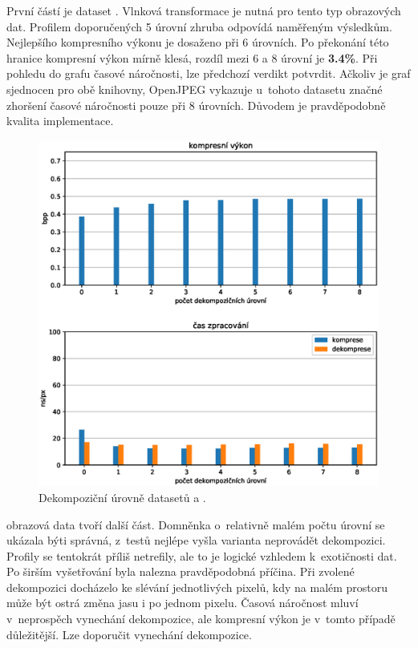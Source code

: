 \noindent První částí je dataset . Vlnková transformace je nutná pro tento typ obrazových dat. Profilem doporučených 5 úrovní zhruba odpovídá naměřeným výsledkům. Nejlepšího kompresního výkonu je dosaženo při 6 úrovních. Po překonání této hranice kompresní výkon mírně klesá, rozdíl mezi 6 a 8 úrovní je \textbf{3.4\%}. Při pohledu do grafu časové náročnosti, lze předchozí verdikt potvrdit. Ačkoliv je graf sjednocen pro obě knihovny, OpenJPEG vykazuje u~tohoto datasetu značné zhoršení časové náročnosti pouze při 8 úrovních. Důvodem je pravděpodobně kvalita implementace.

\begin{figure}[hbt!]
  \centering
  \hspace*{-0.75cm}
  \includegraphics[width=16cm]{obrazky-figures/levels/bitonal_levels.eps}
  \caption{Dekompoziční úrovně datasetů  a .}
\end{figure}

\noindent {} obrazová data tvoří další část. Domněnka o~relativně malém počtu úrovní se ukázala býti správná, z~testů nejlépe vyšla varianta neprovádět dekompozici. Profily se tentokrát příliš netrefily, ale to je logické vzhledem k~exotičnosti dat. Po širším vyšetřování byla nalezna pravděpodobná příčina. Při zvolené dekompozici docházelo ke slévání jednotlivých pixelů, kdy na malém prostoru může být ostrá změna jasu i po jednom pixelu. Časová náročnost mluví v~neprospěch vynechání dekompozice, ale kompresní výkon je v~tomto případě důležitější. Lze doporučit vynechání dekompozice.

